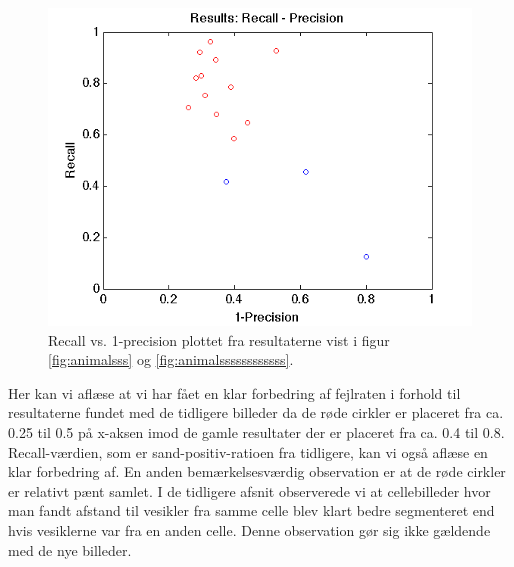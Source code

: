\begin{figure}[H]
	\centering
	\includegraphics[scale=0.9]{files/postmethod/img/recallvsprecision.png}
	\caption{Recall vs. 1-precision plottet fra resultaterne vist i figur \ref{fig:animalsss} og \ref{fig:animalssssssssssss}.\label{fig:postmethod_recallprec}}
\end{figure}

Her kan vi aflæse at vi har fået en klar forbedring af fejlraten i forhold til resultaterne fundet med de tidligere billeder da de røde cirkler er placeret fra ca. 0.25 til 0.5 på x-aksen imod de gamle resultater der er placeret fra ca. 0.4 til 0.8. Recall-værdien, som er sand-positiv-ratioen fra tidligere, kan vi også aflæse en klar forbedring af. En anden bemærkelsesværdig observation er at de røde cirkler er relativt pænt samlet. I de tidligere afsnit observerede vi at cellebilleder hvor man fandt afstand til vesikler fra samme celle blev klart bedre segmenteret end hvis vesiklerne var fra en anden celle. Denne observation gør sig ikke gældende med de nye billeder. 


